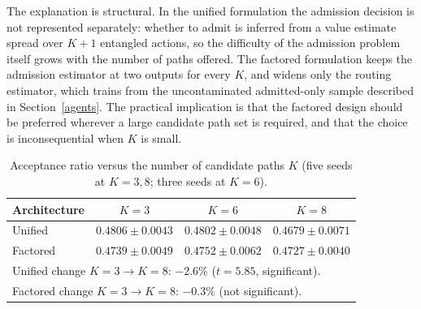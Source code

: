 \documentclass[10pt,journal,comsoc]{IEEEtran}
\begin{document}
The explanation is structural. In the unified formulation the admission
decision is not represented separately: whether to admit is inferred from
a value estimate spread over $K+1$ entangled actions, so the difficulty of
the admission problem itself grows with the number of paths offered. The
factored formulation keeps the admission estimator at two outputs for
every $K$, and widens only the routing estimator, which trains from the
uncontaminated admitted-only sample described in
Section~\ref{agents}. The practical implication is that the factored
design should be preferred wherever a large candidate path set is
required, and that the choice is inconsequential when $K$ is small.

\begin{table}[t]
\centering
\caption{Acceptance ratio versus the number of candidate paths $K$
(five seeds at $K=3,8$; three seeds at $K=6$).}
\label{tab:scaling}
\renewcommand{\arraystretch}{1.2}
\begin{tabular}{lccc}
\toprule
\textbf{Architecture} & $K=3$ & $K=6$ & $K=8$ \\
\midrule
Unified   & $0.4806 \pm 0.0043$ & $0.4802 \pm 0.0048$ & $0.4679 \pm 0.0071$ \\
Factored  & $0.4739 \pm 0.0049$ & $0.4752 \pm 0.0062$ & $0.4727 \pm 0.0040$ \\
\midrule
\multicolumn{4}{l}{\footnotesize Unified change $K{=}3 \to K{=}8$: $-2.6\%$ ($t=5.85$, significant).} \\
\multicolumn{4}{l}{\footnotesize Factored change $K{=}3 \to K{=}8$: $-0.3\%$ (not significant).} \\
\bottomrule
\end{tabular}
\end{table}
\end{document}
